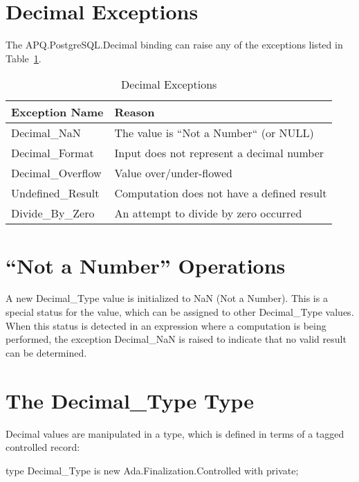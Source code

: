 \documentclass[english,letterpaper]{book}
\begin{document}
\section{Decimal Exceptions}

The APQ\-.PostgreSQL\-.Decimal binding can raise any of the exceptions
listed in Table~\ref{t:decx}.

\begin{table}
   \begin{center}
      \begin{tabular}{ll}
         Exception Name    &  Reason\\
         \hline 
         Decimal\_NaN      &  The value is ``Not a Number{}`` (or NULL)\\
         Decimal\_Format   &  Input does not represent a decimal number\\
         Decimal\_Overflow &  Value over/under-flowed\\
         Undefined\_Result &  Computation does not have a defined result\\
         Divide\_By\_Zero  &  An attempt to divide by zero occurred\\
      \end{tabular}
   \end{center}
   \caption{Decimal Exceptions}\label{t:decx}
\end{table}

\section{``Not a Number'' Operations}

A new Decimal\_Type value is initialized to NaN (Not a
Number). This is a special status for the value, which can be assigned
to other Decimal\_Type values. When this status is detected in an
expression where a computation is being performed, the exception
Decimal\_NaN is raised to indicate that no
valid result can be determined.


\section{The Decimal\_Type Type}

Decimal values are manipulated in a type, which is defined in terms
of a tagged controlled record:

\begin{Code}

   type Decimal_Type is new 
      Ada.Finalization.Controlled with private;

\end{Code}
\end{document}
